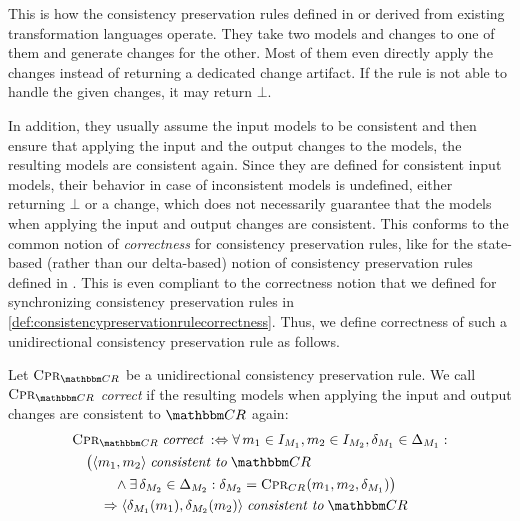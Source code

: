 This is how the consistency preservation rules defined in or derived from existing transformation languages operate.
They take two models and changes to one of them and generate changes for the other.
Most of them even directly apply the changes instead of returning a dedicated change artifact.
If the rule is not able to handle the given changes, it may return $\bot$.

In addition, they usually assume the input models to be consistent and then ensure that applying the input and the output changes to the models, the resulting models are consistent again.
Since they are defined for consistent input models, their behavior in case of inconsistent models is undefined, either returning $\bot$ or a change, which does not necessarily guarantee that the models when applying the input and output changes are consistent.
This conforms to the common notion of \emph{correctness} for consistency preservation rules, like for the state-based (rather than our delta-based) notion of consistency preservation rules defined in \cite{stevens2010sosym}.
This is even compliant to the correctness notion that we defined for synchronizing consistency preservation rules in \autoref{def:consistencypreservationrulecorrectness}.
Thus, we define correctness of such a unidirectional consistency preservation rule as follows.

\begin{definition}
    \label{def:unidirectionalconsistencypreservationrulecorrectness}
    Let $\consistencypreservationrule{\consistencyrelationset{CR}}$ be a unidirectional consistency preservation rule.
    We call $\consistencypreservationrule{\consistencyrelationset{CR}}$ \emph{correct} if the resulting models when applying the input and output changes are consistent to $\consistencyrelationset{CR}$ again:
    \begin{align*}
        &
        \consistencypreservationrule{\consistencyrelationset{CR}} \correctmath \equivalentperdefinition 
        \forall 
        \model{m}{1} \in \metamodelinstanceset{M}{1}, 
        \model{m}{2} \in \metamodelinstanceset{M}{2},
        \change{\metamodel{M}{1}} \in \changeuniverse{\metamodel{M}{1}} : \\
        & \formulaskip
        \bigl( \tupled{\model{m}{1}, \model{m}{2}} \consistenttomath \consistencyrelationset{CR} \\
        & \formulaskip\formulaskip\formulaskip
        \land 
        \exists 
        \change{\metamodel{M}{2}} \in \changeuniverse{\metamodel{M}{2}} :
        \change{\metamodel{M}{2}} = \consistencypreservationrule{\consistencyrelation{CR}{}}(\model{m}{1}, \model{m}{2}, \change{\metamodel{M}{1}}) \bigr) \\
        & \formulaskip\formulaskip
        \Rightarrow
        \tupled{\change{\metamodel{M}{1}}(\model{m}{1}), \change{\metamodel{M}{2}}(\model{m}{2})} \consistenttomath \consistencyrelationset{CR}
    \end{align*}
\end{definition}

